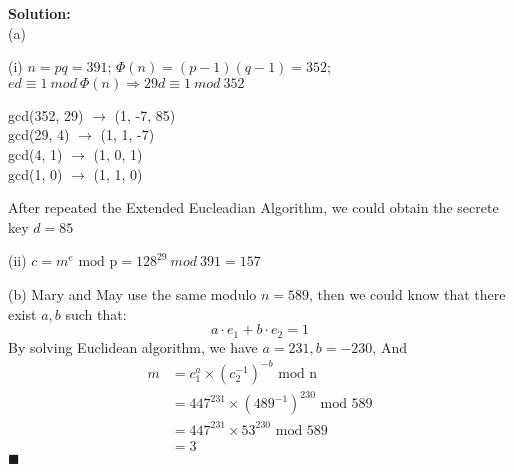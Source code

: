\documentclass{article}
\newenvironment{solution}                               %
{\textbf{Solution:} \\}{$\blacksquare$\newline}         %
\newcommand{\leadto}{\Rightarrow}                       %
\newcommand{\modP}{\text{ mod p}}
\begin{document}
    \begin{solution}
        (a)

        (i) $n=pq=391$; $\Phi(n) = (p-1)(q-1) = 352$; \\
        ${ed \equiv 1\ mod\ \Phi(n)} \leadto {29d \equiv 1\ mod\ 352}$

        gcd(352, 29) $\rightarrow$ (1, -7, 85)\\
        gcd(29, 4)   $\rightarrow$ (1, 1, -7)\\
        gcd(4, 1)    $\rightarrow$ (1, 0, 1)\\
        gcd(1, 0)    $\rightarrow$ (1, 1, 0)

        After repeated the Extended Eucleadian Algorithm, we could obtain the secrete key $d=85$
        
        (ii) $c = m^e \modP = 128^{29}\ mod\ 391 = 157$

        (b) Mary and May use the same modulo $n=589$, then we could know that there exist $a,b$ such that:
        $$
            a \cdot e_1 + b \cdot e_2 = 1
        $$
        By solving Euclidean algorithm, we have $a=231, b=-230$, And 
        \begin{align*}
            m &= c_1^{a} \times (c_2^{-1})^{-b} \text{ mod n} \\
              &= 447^{231} \times (489^{-1})^{230} \text{ mod 589} \\
              &= 447^{231} \times 53^{230} \text{ mod 589} \\
              &= 3
        \end{align*}
    \end{solution}
\end{document}
